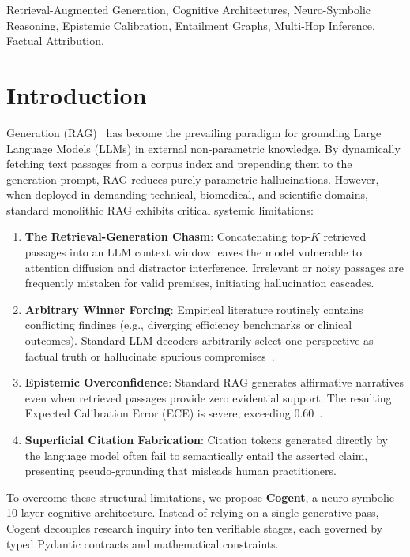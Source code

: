\documentclass[journal,compsoc]{IEEEtran}
\begin{document}
\begin{IEEEkeywords}
Retrieval-Augmented Generation, Cognitive Architectures, Neuro-Symbolic Reasoning, Epistemic Calibration, Entailment Graphs, Multi-Hop Inference, Factual Attribution.
\end{IEEEkeywords}

\section{Introduction}
 Generation (RAG)~\cite{lewis2020rag,karpukhin2020dpr} has become the prevailing paradigm for grounding Large Language Models (LLMs) in external non-parametric knowledge. By dynamically fetching text passages from a corpus index and prepending them to the generation prompt, RAG reduces purely parametric hallucinations. However, when deployed in demanding technical, biomedical, and scientific domains, standard monolithic RAG exhibits critical systemic limitations:
\begin{enumerate}
    \item \textbf{The Retrieval-Generation Chasm}: Concatenating top-$K$ retrieved passages into an LLM context window leaves the model vulnerable to attention diffusion and distractor interference. Irrelevant or noisy passages are frequently mistaken for valid premises, initiating hallucination cascades.
    \item \textbf{Arbitrary Winner Forcing}: Empirical literature routinely contains conflicting findings (e.g., diverging efficiency benchmarks or clinical outcomes). Standard LLM decoders arbitrarily select one perspective as factual truth or hallucinate spurious compromises~\cite{yuan2026confrag}.
    \item \textbf{Epistemic Overconfidence}: Standard RAG generates affirmative narratives even when retrieved passages provide zero evidential support. The resulting Expected Calibration Error (ECE) is severe, exceeding 0.60~\cite{ni2026trustworthy,guo2017calibration}.
    \item \textbf{Superficial Citation Fabrication}: Citation tokens generated directly by the language model often fail to semantically entail the asserted claim, presenting pseudo-grounding that misleads human practitioners.
\end{enumerate}

To overcome these structural limitations, we propose \textbf{Cogent}, a neuro-symbolic 10-layer cognitive architecture. Instead of relying on a single generative pass, Cogent decouples research inquiry into ten verifiable stages, each governed by typed Pydantic contracts and mathematical constraints.
\end{document}

